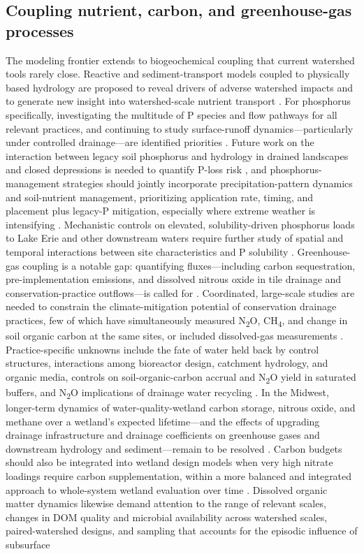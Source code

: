 \documentclass[11pt]{article}
\begin{document}
\subsection{Coupling nutrient, carbon, and greenhouse-gas processes}

The modeling frontier extends to biogeochemical coupling that current watershed tools rarely close. Reactive and sediment-transport models coupled to physically based hydrology are proposed to reveal drivers of adverse watershed impacts and to generate new insight into watershed-scale nutrient transport \parencite{Rathore2025}. For phosphorus specifically, investigating the multitude of P species and flow pathways for all relevant practices, and continuing to study surface-runoff dynamics---particularly under controlled drainage---are identified priorities \parencite{Mitchell2023}. Future work on the interaction between legacy soil phosphorus and hydrology in drained landscapes and closed depressions is needed to quantify P-loss risk \parencite{Mumbi2024}, and phosphorus-management strategies should jointly incorporate precipitation-pattern dynamics and soil-nutrient management, prioritizing application rate, timing, and placement plus legacy-P mitigation, especially where extreme weather is intensifying \parencite{Mumbi2025b}. Mechanistic controls on elevated, solubility-driven phosphorus loads to Lake Erie and other downstream waters require further study of spatial and temporal interactions between site characteristics and P solubility \parencite{Hanrahan2020}. Greenhouse-gas coupling is a notable gap: quantifying fluxes---including carbon sequestration, pre-implementation emissions, and dissolved nitrous oxide in tile drainage and conservation-practice outflows---is called for \parencite{Mitchell2023}. Coordinated, large-scale studies are needed to constrain the climate-mitigation potential of conservation drainage practices, few of which have simultaneously measured N\textsubscript{2}O, CH\textsubscript{4}, and change in soil organic carbon at the same sites, or included dissolved-gas measurements \parencite{Hall2025}. Practice-specific unknowns include the fate of water held back by control structures, interactions among bioreactor design, catchment hydrology, and organic media, controls on soil-organic-carbon accrual and N\textsubscript{2}O yield in saturated buffers, and N\textsubscript{2}O implications of drainage water recycling \parencite{Hall2025}. In the Midwest, longer-term dynamics of water-quality-wetland carbon storage, nitrous oxide, and methane over a wetland's expected lifetime---and the effects of upgrading drainage infrastructure and drainage coefficients on greenhouse gases and downstream hydrology and sediment---remain to be resolved \parencite{Mitchell2022}. Carbon budgets should also be integrated into wetland design models when very high nitrate loadings require carbon supplementation, within a more balanced and integrated approach to whole-system wetland evaluation over time \parencite{Kadlec2012}. Dissolved organic matter dynamics likewise demand attention to the range of relevant scales, changes in DOM quality and microbial availability across watershed scales, paired-watershed designs, and sampling that accounts for the episodic influence of subsurface 
\end{document}
